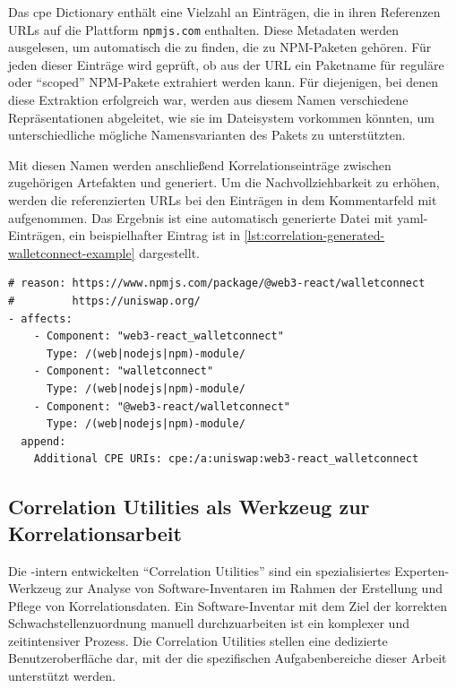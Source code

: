 Das \acrshort{cpe} Dictionary enthält eine Vielzahl an Einträgen, die in ihren Referenzen URLs auf die Plattform \texttt{npmjs.com} enthalten.
Diese Metadaten werden ausgelesen, um automatisch die  zu finden, die zu NPM-Paketen gehören.
Für jeden dieser Einträge wird geprüft, ob aus der URL ein Paketname für reguläre oder \enquote{scoped} NPM-Pakete extrahiert werden kann.
Für diejenigen, bei denen diese Extraktion erfolgreich war, werden aus diesem Namen verschiedene Repräsentationen abgeleitet, wie sie im Dateisystem vorkommen könnten, um unterschiedliche mögliche Namensvarianten des Pakets zu unterstützten.

Mit diesen Namen werden anschließend Korrelationseinträge zwischen zugehörigen Artefakten und  generiert.
Um die Nachvollziehbarkeit zu erhöhen, werden die referenzierten URLs bei den Einträgen in dem Kommentarfeld mit aufgenommen.
Das Ergebnis ist eine automatisch generierte Datei mit \acrshort{yaml}-Einträgen, ein beispielhafter Eintrag ist in \autoref{lst:correlation-generated-walletconnect-example} dargestellt.

\begin{lstlisting}[style=yaml,caption={Automatisch generierte Korrelationseinträge zu react-walletconnect},label={lst:correlation-generated-walletconnect-example}]
# reason: https://www.npmjs.com/package/@web3-react/walletconnect
#         https://uniswap.org/
- affects:
    - Component: "web3-react_walletconnect"
      Type: /(web|nodejs|npm)-module/
    - Component: "walletconnect"
      Type: /(web|nodejs|npm)-module/
    - Component: "@web3-react/walletconnect"
      Type: /(web|nodejs|npm)-module/
  append:
    Additional CPE URIs: cpe:/a:uniswap:web3-react_walletconnect
\end{lstlisting}

\subsection{Correlation Utilities als Werkzeug zur Korrelationsarbeit}\label{subsec:correlation-utilities}

Die \metaeffekt-intern entwickelten \enquote{Correlation Utilities} sind ein spezialisiertes Experten-Werkzeug zur Analyse von Software-Inventaren im Rahmen der Erstellung und Pflege von Korrelationsdaten.
Ein Software-Inventar mit dem Ziel der korrekten Schwachstellenzuordnung manuell durchzuarbeiten ist ein komplexer und zeitintensiver Prozess.
Die Correlation Utilities stellen eine dedizierte Benutzeroberfläche dar, mit der die spezifischen Aufgabenbereiche dieser Arbeit unterstützt werden.


